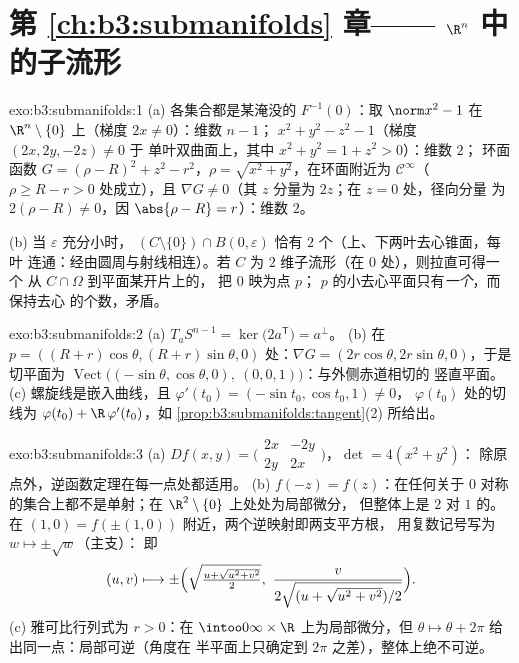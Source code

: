 \section*{第 \ref{ch:b3:submanifolds} 章——
$\R^n$ 中的子流形}

\begin{solution}{exo:b3:submanifolds:1}
(a) 各集合都是某淹没的 $F^{-1}(0)$：取 $\norm x^2 - 1$ 在
$\R^n\setminus\{0\}$ 上（梯度 $2x \neq 0$）：维数 $n-1$；
$x^2 + y^2 - z^2 - 1$（梯度 $(2x, 2y, -2z) \neq 0$ 于
单叶双曲面上，其中 $x^2 + y^2 = 1 + z^2 > 0$）：维数 $2$；
环面函数 $G = (\rho - R)^2 + z^2 - r^2$，$\rho =
\sqrt{x^2+y^2}$，在环面附近为 $\mathcal C^\infty$（$\rho
\geq R - r > 0$ 处成立），且 $\nabla G \neq 0$（其
$z$ 分量为 $2z$；在 $z = 0$ 处，径向分量
为 $2(\rho - R)\ne0$，因 $\abs{\rho - R} = r$）：维数
$2$。

(b) 当 $\varepsilon$ 充分小时，
$(C\setminus\{0\})\cap B(0,\varepsilon)$ 恰有 $2$
个（上、下两叶去心锥面，每叶
连通：经由圆周与射线相连）。若 $C$
为 $2$ 维子流形（在 $0$ 处），则拉直可得一个
从 $C\cap\Omega$ 到平面某开片上的，
把 $0$ 映为点 $p$；
$p$ 的小去心平面只有\emph{一个}，而
保持去心
的个数，矛盾。
\end{solution}

\begin{solution}{exo:b3:submanifolds:2}
(a) $T_aS^{n-1} = \ker\bigl(2a^{\mathsf T}\bigr) = a^\perp$。
(b) 在 $p = ((R+r)\cos\theta, (R+r)\sin\theta, 0)$ 处：$\nabla G
= (2r\cos\theta, 2r\sin\theta, 0)$，于是切平面为
$\operatorname{Vect}\bigl((-\sin\theta, \cos\theta, 0),\ (0,
0, 1)\bigr)$：与外侧赤道相切的
竖直平面。
(c) 螺旋线是嵌入曲线，且 $\varphi'(t_0) =
(-\sin t_0, \cos t_0, 1) \neq 0$，
$\varphi(t_0)$ 处的切线为 $\varphi(t_0) + \R\,\varphi'(t_0)$，如
\cref{prop:b3:submanifolds:tangent}(2) 所给出。
\end{solution}

\begin{solution}{exo:b3:submanifolds:3}
(a) $Df(x,y) = \bigl(\begin{smallmatrix}2x & -2y\\ 2y &
2x\end{smallmatrix}\bigr)$，$\det = 4(x^2 + y^2)$：
除原点外，逆函数定理在每一点处都适用。
(b) $f(-z) = f(z)$：在任何关于
$0$ 对称的集合上都不是单射；在 $\R^2\setminus\{0\}$ 上处处为局部微分，
但整体上是 $2$ 对 $1$ 的。在 $(1, 0) = f(\pm(1,
0))$ 附近，两个逆映射即两支平方根，
用复数记号写为 $w \mapsto \pm\sqrt w$（主支）：
即
\[
(u, v) \longmapsto \pm\Bigl(\sqrt{\tfrac{u +
\sqrt{u^2+v^2}}{2}},\ \frac{v}{2\sqrt{(u +
\sqrt{u^2+v^2})/2}}\Bigr).
\]
(c) 雅可比行列式为 $r > 0$：在
$\intoo0\infty\times\R$ 上为局部微分，但 $\theta \mapsto \theta + 2\pi$
给出同一点：局部可逆（角度在
半平面上只确定到 $2\pi$ 之差），整体上绝不可逆。
\end{solution}

